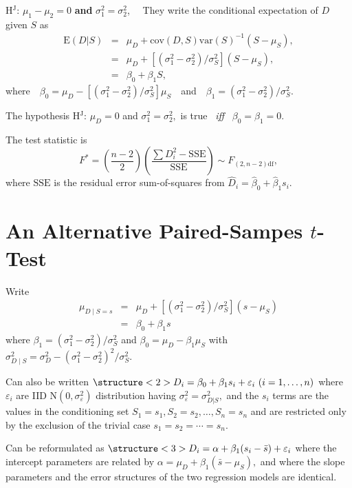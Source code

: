 \documentclass[a4]{beamer}
\begin{document}
\begin{frame}
 \begin{exampleblock}{H$^{\textrm{J}}$: $\mu_1-\mu_2=0$ \textbf{and} $\sigma^2_1=\sigma^2_2$,\ \ \cite{BradBlack89}}
 They write the conditional expectation of $D$ given $S$ as
  \begin{eqnarray*}
    \mathrm{E}(D|S) & = & \mu_D + \mathrm{cov}(D,S)
        \mathrm{var}(S)^{-1}(S-\mu_S), \nonumber \\
        & = & \mu_D + [(\sigma^2_1-\sigma^2_2)/ \sigma^2_S]
        (S - \mu_S),\\
        & = &\beta_0 + \beta_1 S,
  \end{eqnarray*}
  where\ \ $\beta_0=\mu_D-[(\sigma^2_1-\sigma^2_2)/ \sigma^2_S] \mu_S$\ \ and\ \ $\beta_1 = (\sigma^2_1-\sigma^2_2)/ \sigma^2_S.$\pause\\ \bigskip

  The hypothesis H$^{\textrm{J}}$: $\mu_D = 0$ and $\sigma^2_1 = \sigma^2_2,$ is true \ \textit{iff} \ $\beta_0=\beta_1=0.$\pause\\ \bigskip

  The test statistic is
\begin{equation}\label{BB:Fstat}
F^* = (\frac{n-2}{2}) (\frac{\sum {D_i^2} - \mathrm{SSE}}{\mathrm{SSE}}) \sim F_{(2,n-2)\textrm{df}} ,
\end{equation}
where $\mathrm{SSE}$ is the residual error sum-of-squares from \alert<4->{$\hat{D}_i=\hat{\beta}_0 +\hat{\beta}_1 s_i$.}
 \end{exampleblock}
\end{frame}



\section{An Alternative Paired-Sampes $t$-Test}

\begin{frame}[t]
Write
\begin{eqnarray*}
\mu_{D \mid S=s} &=& \mu_D + [ ( \sigma^2_1 - \sigma^2_2) / \sigma^2_S ] (s - \mu_S)\\
 &=& \beta_0 + \beta_1 s
 \end{eqnarray*}
where $\beta_1 = (\sigma^2_1 - \sigma^2_2 )/ \sigma^2_S$ and $\beta_0 = \mu_D- \beta_1 \mu_S$ with $\sigma^2_{D\mid S} = \sigma^2_D - ( \sigma^2_1 - \sigma^2_2 )^2 / \sigma^2_S.$\pause
\medskip

Can also be written $\structure<2>{D_i = \beta_0 + \beta_1 s_i + \varepsilon_i}\ (i=1,\ldots,n)$ where $\varepsilon_i$ are IID $\mathrm{N}(0,\sigma^2_\varepsilon)$ distribution having $\sigma^2_\varepsilon = \sigma^2_{D|S},$ and the $s_i$ terms are the values in the conditioning set $S_1 = s_1, S_2 = s_2, \ldots , S_n=s_n$ and are restricted only by the exclusion of the trivial case $s_1 = s_2 = \cdots = s_n.$ \medskip\pause

Can be reformulated as $\structure<3>{D_i = \alpha + \beta_1 ( s_i - \bar{s} ) + \varepsilon_i}$ where the intercept parameters are related by $\alpha = \mu_D + \beta_1 (\bar{s}-\mu_S),$ and where the slope parameters and the error structures of the two regression models are identical.
\end{frame}
\end{document}
